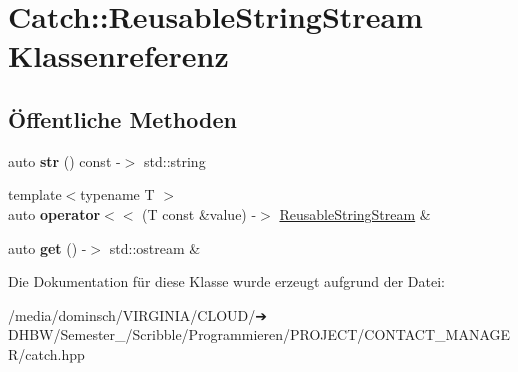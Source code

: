 \hypertarget{classCatch_1_1ReusableStringStream}{}\section{Catch\+:\+:Reusable\+String\+Stream Klassenreferenz}
\label{classCatch_1_1ReusableStringStream}
\subsection*{Öffentliche Methoden}
\begin{DoxyCompactItemize}
\item 
\mbox{\label{classCatch_1_1ReusableStringStream_a0e9ecf260b2a5d35f4886ef0d51f6270}} 
auto {\bfseries str} () const -\/$>$ std\+::string
\item 
\mbox{\label{classCatch_1_1ReusableStringStream_af95f72024c082db70e5e50782e28e4f6}} 
{\footnotesize template$<$typename T $>$ }\\auto {\bfseries operator$<$$<$} (T const \&value) -\/$>$ \hyperlink{classCatch_1_1ReusableStringStream}{Reusable\+String\+Stream} \&
\item 
\mbox{\label{classCatch_1_1ReusableStringStream_a6881808c60a080d4e24a0b81c94cbf67}} 
auto {\bfseries get} () -\/$>$ std\+::ostream \&
\end{DoxyCompactItemize}


Die Dokumentation für diese Klasse wurde erzeugt aufgrund der Datei\+:\begin{DoxyCompactItemize}
\item 
/media/dominsch/\+V\+I\+R\+G\+I\+N\+I\+A/\+C\+L\+O\+U\+D/➔ D\+H\+B\+W/\+Semester\+\_/\+Scribble/\+Programmieren/\+P\+R\+O\+J\+E\+C\+T/\+C\+O\+N\+T\+A\+C\+T\+\_\+\+M\+A\+N\+A\+G\+E\+R/catch.\+hpp\end{DoxyCompactItemize}
